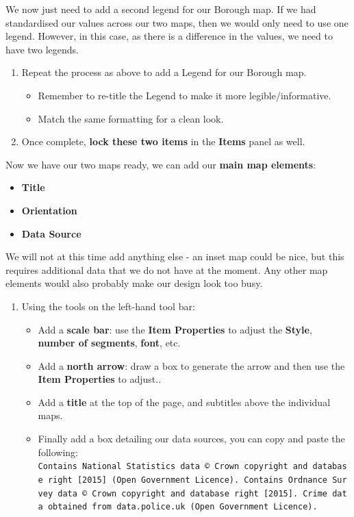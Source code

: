 \documentclass[
]{book}
\providecommand{\tightlist}{%
  \setlength{\itemsep}{0pt}\setlength{\parskip}{0pt}}
\begin{document}
We now just need to add a second legend for our Borough map. If we had standardised our values across our two maps, then we would only need to use one legend. However, in this case, as there is a difference in the values, we need to have two legends.

\begin{enumerate}
\def\labelenumi{\arabic{enumi}.}
\setcounter{enumi}{6}
\tightlist
\item
  Repeat the process as above to add a Legend for our Borough map.

  \begin{itemize}
  \tightlist
  \item
    Remember to re-title the Legend to make it more legible/informative.
  \item
    Match the same formatting for a clean look.
  \end{itemize}
\item
  Once complete, \textbf{lock these two items} in the \textbf{Items} panel as well.
\end{enumerate}

Now we have our two maps ready, we can add our \textbf{main map elements}:

\begin{itemize}
\tightlist
\item
  \textbf{Title}
\item
  \textbf{Orientation}
\item
  \textbf{Data Source}
\end{itemize}

We will not at this time add anything else - an inset map could be nice, but this requires additional data that we do not have at the moment. Any other map elements would also probably make our design look too busy.

\begin{enumerate}
\def\labelenumi{\arabic{enumi}.}
\setcounter{enumi}{8}
\tightlist
\item
  Using the tools on the left-hand tool bar:

  \begin{itemize}
  \tightlist
  \item
    Add a \textbf{scale bar}: use the \textbf{Item Properties} to adjust the \textbf{Style}, \textbf{number of segments}, \textbf{font}, etc.
  \item
    Add a \textbf{north arrow}: draw a box to generate the arrow and then use the \textbf{Item Properties} to adjust..
  \item
    Add a \textbf{title} at the top of the page, and subtitles above the individual maps.
  \item
    Finally add a box detailing our data sources, you can copy and paste the following:
    \texttt{Contains\ National\ Statistics\ data\ ©\ Crown\ copyright\ and\ database\ right\ {[}2015{]}\ (Open\ Government\ Licence).\ Contains\ Ordnance\ Survey\ data\ ©\ Crown\ copyright\ and\ database\ right\ {[}2015{]}.\ Crime\ data\ obtained\ from\ data.police.uk\ (Open\ Government\ Licence).}
  \end{itemize}
\end{enumerate}
\end{document}
